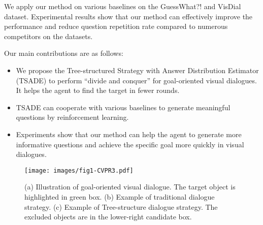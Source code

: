 We apply our method on various baselines on the GuessWhat?! and VisDial dataset. Experimental results show that our method can effectively improve the performance and reduce question repetition rate compared to numerous competitors on the datasets.

Our main contributions are as follows:
\begin{itemize}
\item We propose the Tree-structured Strategy with Answer Distribution Estimator (TSADE) to perform ``divide and conquer'' for goal-oriented visual dialogues. 
It helps the agent to find the target in fewer rounds.

\item TSADE can cooperate with various baselines to generate meaningful questions by reinforcement learning.

\item Experiments show that our method can help the agent to generate more informative questions and achieve the specific goal more quickly in visual dialogues.
\end{itemize}

\begin{figure}[htbp]
  \centering
  \texttt{[image: images/fig1-CVPR3.pdf]}
  \caption{(a) Illustration of goal-oriented visual dialogue. The target object is highlighted in green box. (b) Example of traditional dialogue strategy. (c) Example of Tree-structure dialogue strategy. The excluded objects are in the lower-right candidate box.}
  \label{fig:1}
\end{figure}


